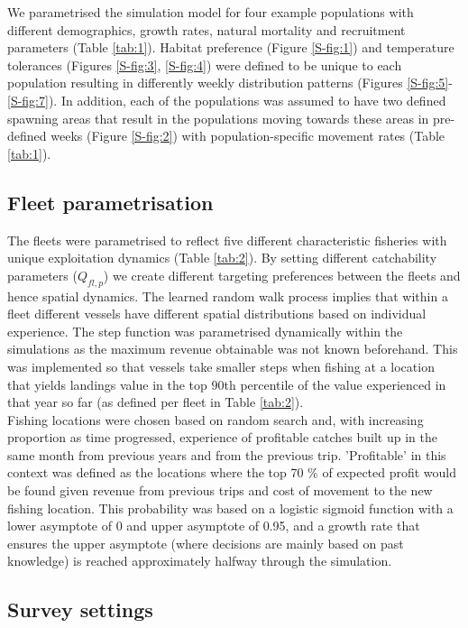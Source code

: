\documentclass[review]{elsarticle}
\begin{document}
We parametrised the simulation model for four example populations with
different demographics, growth rates, natural mortality and recruitment
parameters (Table \ref{tab:1}). Habitat preference (Figure \ref{S-fig:1}) and
temperature tolerances (Figures \ref{S-fig:3}, \ref{S-fig:4}) were defined to
be unique to each population resulting in differently weekly distribution
patterns (Figures \ref{S-fig:5}-\ref{S-fig:7}). In addition, each of the
populations was assumed to have two defined spawning areas that result in the
populations moving towards these areas in pre-defined weeks (Figure
\ref{S-fig:2}) with population-specific movement rates (Table \ref{tab:1}).

\subsection{Fleet parametrisation}

The fleets were parametrised to reflect five different characteristic fisheries
with unique exploitation dynamics (Table \ref{tab:2}). By setting different
catchability parameters ($Q_{fl, p}$) we create different targeting preferences
between the fleets and hence spatial dynamics.  The learned random walk process
implies that within a fleet different vessels have different spatial
distributions based on individual experience. The step function was
parametrised dynamically within the simulations as the maximum revenue
obtainable was not known beforehand. This was implemented so that vessels take
smaller steps when fishing at a location that yields landings value in the top
90th percentile of the value experienced in that year so far (as defined per
fleet in Table \ref{tab:2}). \\

Fishing locations were chosen based on random search and, with increasing
proportion as time progressed, experience of profitable catches built up in the
same month from previous years and from the previous trip.  'Profitable' in
this context was defined as the locations where the top 70 \% of expected
profit would be found given revenue from previous trips and cost of movement to
the new fishing location. This probability was based on a logistic sigmoid
function with a lower asymptote of 0 and upper asymptote of 0.95, and a growth
rate that ensures the upper asymptote (where decisions are mainly based on past
knowledge) is reached approximately halfway through the simulation.  \\


\subsection{Survey settings}
\end{document}
